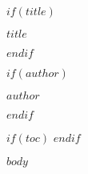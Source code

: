 \documentclass[11pt,a5paper,oneside]{book}
\begin{document}
$if(title)$
  {\centering\ptserifbold\fontsize{18pt}{20pt}\selectfont $title$\par}
  \vspace{2em}
$endif$

$if(author)$
  {\centering\ptserifbold\fontsize{14pt}{16pt}\selectfont $author$\par}
  \vspace{2em}
$endif$

$if(toc)$
  {\tableofcontents}
  \newpage
$endif$

$body$
\end{document}
